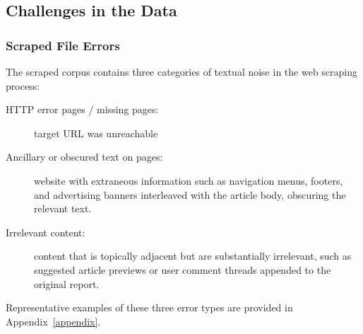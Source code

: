 \documentclass{article}
\begin{document}




\subsection{Challenges in the Data}\label{challenges-in-the-data}

\subsubsection{Scraped File Errors}\label{scraped-file-errors}

The scraped corpus contains three categories of textual noise in the web scraping process: 
\begin{description}
    \item[HTTP error pages / missing pages:] target URL was unreachable
    \item[Ancillary or obscured text on pages:] website with
    extraneous information such as navigation menus, footers, and
    advertising banners interleaved with the article body, obscuring the
    relevant text.
    \item[Irrelevant content:]  content that is
topically adjacent but are substantially irrelevant, such as suggested
article previews or user comment threads appended to the original
report.
\end{description}

Representative examples of these three error types are provided in Appendix~\ref{appendix}.
\end{document}
